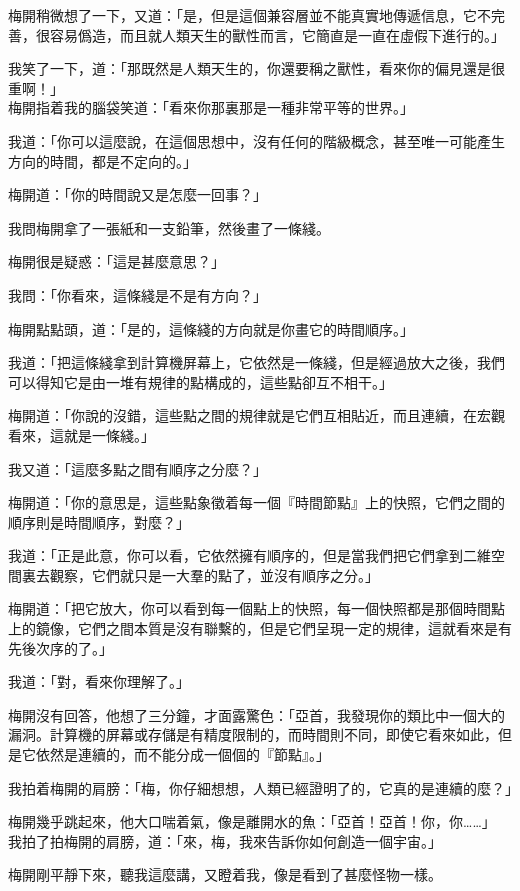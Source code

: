 梅開稍微想了一下，又道：「是，但是這個兼容層並不能真實地傳遞信息，它不完善，很容易僞造，而且就人類天生的獸性而言，它簡直是一直在虛假下進行的。」

我笑了一下，道：「那既然是人類天生的，你還要稱之獸性，看來你的偏見還是很重啊！」
\\


梅開指着我的腦袋笑道：「看來你那裏那是一種非常平等的世界。」

我道：「你可以這麼說，在這個思想中，沒有任何的階級概念，甚至唯一可能產生方向的時間，都是不定向的。」

梅開道：「你的時間說又是怎麼一回事？」

我問梅開拿了一張紙和一支鉛筆，然後畫了一條綫。

梅開很是疑惑：「這是甚麼意思？」

我問：「你看來，這條綫是不是有方向？」

梅開點點頭，道：「是的，這條綫的方向就是你畫它的時間順序。」

我道：「把這條綫拿到計算機屏幕上，它依然是一條綫，但是經過放大之後，我們可以得知它是由一堆有規律的點構成的，這些點卻互不相干。」

梅開道：「你說的沒錯，這些點之間的規律就是它們互相貼近，而且連續，在宏觀看來，這就是一條綫。」

我又道：「這麼多點之間有順序之分麼？」

梅開道：「你的意思是，這些點象徵着每一個『時間節點』上的快照，它們之間的順序則是時間順序，對麼？」

我道：「正是此意，你可以看，它依然擁有順序的，但是當我們把它們拿到二維空間裏去觀察，它們就只是一大羣的點了，並沒有順序之分。」

梅開道：「把它放大，你可以看到每一個點上的快照，每一個快照都是那個時間點上的鏡像，它們之間本質是沒有聯繫的，但是它們呈現一定的規律，這就看來是有先後次序的了。」

我道：「對，看來你理解了。」

梅開沒有回答，他想了三分鐘，才面露驚色：「亞首，我發現你的類比中一個大的漏洞。計算機的屏幕或存儲是有精度限制的，而時間則不同，即使它看來如此，但是它依然是連續的，而不能分成一個個的『節點』。」

我拍着梅開的肩膀：「梅，你仔細想想，人類已經證明了的，它真的是連續的麼？」

梅開幾乎跳起來，他大口喘着氣，像是離開水的魚：「亞首！亞首！你，你……」
\\


我拍了拍梅開的肩膀，道：「來，梅，我來告訴你如何創造一個宇宙。」

梅開剛平靜下來，聽我這麼講，又瞪着我，像是看到了甚麼怪物一樣。


